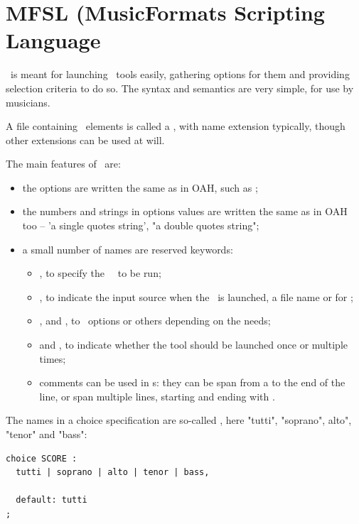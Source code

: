
\chapter{MFSL (MusicFormats Scripting Language}

\mfslLang\ is meant for launching \mf\ tools easily, gathering options for them and providing selection criteria to do so. The syntax and semantics are very simple, for use by musicians.

A file containing \mfslLang\ elements is called a {\it \script}, with name extension  typically, though other extensions can be used at will.

The main features of \mfslLang\ are:
\begin{itemize}
\item the options are written the same as in OAH, such as ;

\item the numbers and strings in options values are written the same as in OAH too -- 'a single quotes string', "a double quotes string";

\item a small number of names are reserved keywords:
\begin{itemize}
\item {}, to specify the \mf\ \tool\ to be run;
\item {}, to indicate the input source when the \tool\ is launched, a file name or \code{-} for \standardInput;
\item {},  and , to \select\ options or others depending on the needs;
\item {} and , to indicate whether the tool should be launched once or multiple times;
\item comments can be used in \script s: they can be span from a \code{\#} to the end of the line, or span multiple lines, starting and ending with \code{\#\#\#}.
\end{itemize}
\end{itemize}

The names in a choice specification are so-called , here "tutti", "soprano", alto", "tenor" and "bass":
\begin{lstlisting}[language=Terminal]
choice SCORE :
  tutti | soprano | alto | tenor | bass,

  default: tutti
;
\end{lstlisting}

